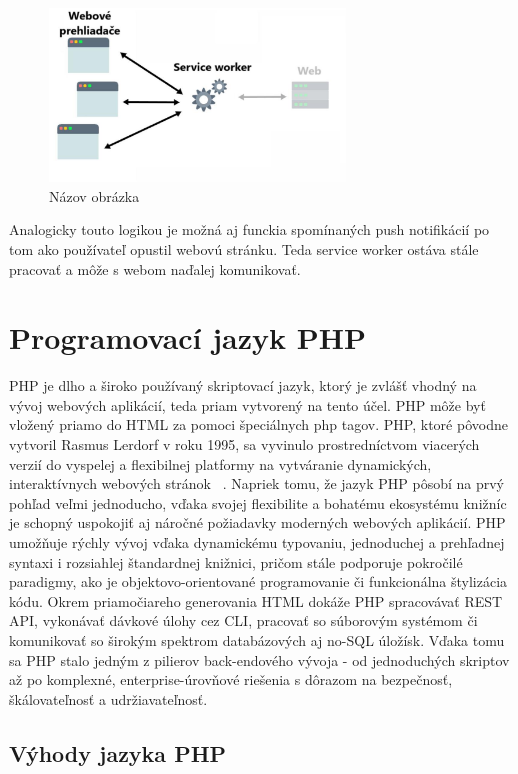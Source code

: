 \begin{figure}[H]
  \centering
  \includegraphics[width=0.7\textwidth]{img/image2.pdf}
  \caption{Názov obrázka \cite{Ater2017BuildingPWA}}
  \label{fig:obrazok2}
\end{figure}

Analogicky touto logikou je možná aj funckia spomínaných push notifikácií po tom ako používateľ opustil webovú stránku. Teda service worker ostáva
stále pracovať a môže s webom naďalej komunikovať.


\section {Programovací jazyk PHP}
PHP je dlho a široko používaný skriptovací jazyk, ktorý je zvlášť vhodný na vývoj webových aplikácií, teda priam vytvorený
na tento účel. PHP môže byť vložený priamo do HTML za pomoci špeciálnych php tagov. PHP, ktoré pôvodne vytvoril Rasmus 
Lerdorf v roku 1995, sa vyvinulo prostredníctvom viacerých verzií do vyspelej a flexibilnej platformy na vytváranie dynamických, 
interaktívnych webových stránok ~\cite{sklar2004learningphp5}. Napriek tomu, že jazyk PHP pôsobí na prvý pohľad veľmi jednoducho, 
vďaka svojej flexibilite a bohatému ekosystému knižníc je schopný uspokojiť aj náročné požiadavky moderných webových aplikácií. 
PHP umožňuje rýchly vývoj vďaka dynamickému typovaniu, jednoduchej a prehľadnej syntaxi i rozsiahlej štandardnej knižnici, 
pričom stále podporuje pokročilé paradigmy, ako je objektovo-orientované programovanie či funkcionálna štylizácia kódu. Okrem 
priamočiareho generovania HTML dokáže PHP spracovávať REST API, vykonávať dávkové úlohy cez CLI, pracovať so súborovým systémom 
či komunikovať so širokým spektrom databázových aj no-SQL úložísk. Vďaka tomu sa PHP stalo jedným z pilierov back-endového 
vývoja - od jednoduchých skriptov až po komplexné, enterprise-úrovňové riešenia s dôrazom na bezpečnosť, škálovateľnosť a 
udržiavateľnosť.

\subsection {Výhody jazyka PHP}

